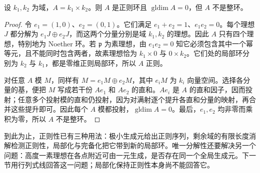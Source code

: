 \begin{proposition}\label{b3:prop:regular-product-rings}
	设 \(k_1,k_2\) 为域，\(A=k_1\times k_2\)。则 \(A\) 是正则环且 \(\operatorname{gldim}A=0\)，但 \(A\) 不是整环。
\end{proposition}
\begin{proof}
	令 \(e_1=(1,0)\)、\(e_2=(0,1)\)。它们满足 \(e_1+e_2=1\)、\(e_1e_2=0\)。每个理想 \(J\) 都分解为 \(e_1J\oplus e_2J\)，而这两个分量分别是域 \(k_1,k_2\) 的理想。因此 \(A\) 只有四个理想，特别地为 Noether 环。若 \(\mathfrak p\) 为素理想，由 \(e_1e_2=0\) 知它必须包含其中一个幂等元，且不能同时包含两者，故素理想恰为 \(k_1\times0\) 与 \(0\times k_2\)。它们处的局部环分别为 \(k_2\) 与 \(k_1\)，都是零维正则局部环，所以 \(A\) 正则。

	对任意 \(A\) 模 \(M\)，同样有 \(M=e_1M\oplus e_2M\)，其中 \(e_iM\) 为 \(k_i\) 向量空间。选择各分量的基，便把 \(M\) 写成若干份 \(Ae_1\) 和 \(Ae_2\) 的直和。\(Ae_i\) 是 \(A\) 的直和因子，因而投射；任意多个投射模的直和仍投射，因为对满射逐个提升各直和分量的映射，再合并这些提升即可。因此每个 \(A\) 模都投射，\(\operatorname{gldim}A=0\)。最后，\(e_1,e_2\) 均非零而乘积为零，所以 \(A\) 不是整环。
\end{proof}

\ProseParagraphBreak
到此为止，正则性已有三种用法：极小生成元给出正则序列，剩余域的有限长度消解检测正则性，局部化与完备化把它带到新的局部环。唯一分解性还要解决另一个问题：高度一素理想在各点附近可由一元生成，是否存在同一个全局生成元。下一节用行列式线回答这一问题；局部化保持正则性本身尚不能回答它。
